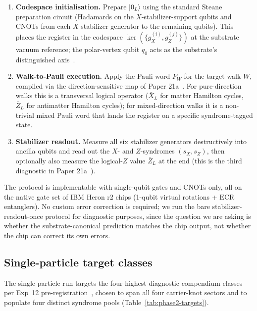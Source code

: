 \documentclass[11pt]{article}
\newcommand{\barX}{\bar X_L}
\newcommand{\barZ}{\bar Z_L}
\begin{document}
\begin{enumerate}
\item \textbf{Codespace initialisation.}  Prepare $|0_L\rangle$ using the standard Steane preparation circuit (Hadamards on the $X$-stabilizer-support qubits and CNOTs from each $X$-stabilizer generator to the remaining qubits).  This places the register in the codespace $\ker(\{g_X^{(i)}, g_Z^{(j)}\})$ at the substrate vacuum reference; the polar-vertex qubit $q_0$ acts as the substrate's distinguished axis~\cite[\S 5.1]{Paper21a}.
\item \textbf{Walk-to-Pauli execution.}  Apply the Pauli word $P_W$ for the target walk $W$, compiled via the direction-sensitive map of Paper 21a~\cite[\S 5.2]{Paper21a}.  For pure-direction walks this is a transversal logical operator ($\barX$ for matter Hamilton cycles, $\barZ$ for antimatter Hamilton cycles); for mixed-direction walks it is a non-trivial mixed Pauli word that lands the register on a specific syndrome-tagged state.
\item \textbf{Stabilizer readout.}  Measure all six stabilizer generators destructively into ancilla qubits and read out the $X$- and $Z$-syndromes $(s_X, s_Z)$, then optionally also measure the logical-$Z$ value $\barZ$ at the end (this is the third diagnostic in Paper 21a~\cite[Table 4]{Paper21a}).
\end{enumerate}

The protocol is implementable with single-qubit gates and CNOTs only, all on the native gate set of IBM Heron r2 chips (1-qubit virtual rotations + $\mathrm{ECR}$ entanglers).  No custom error correction is required; we run the bare stabilizer-readout-once protocol for diagnostic purposes, since the question we are asking is whether the substrate-canonical prediction matches the chip output, not whether the chip can correct its own errors.

\subsection{Single-particle target classes}
\label{sec:phase2-targets}

The single-particle run targets the four highest-diagnostic compendium classes per Exp~12 pre-registration~\cite{Exp12Prereg}, chosen to span all four carrier-knot sectors and to populate four distinct syndrome pools (Table~\ref{tab:phase2-targets}).
\end{document}
